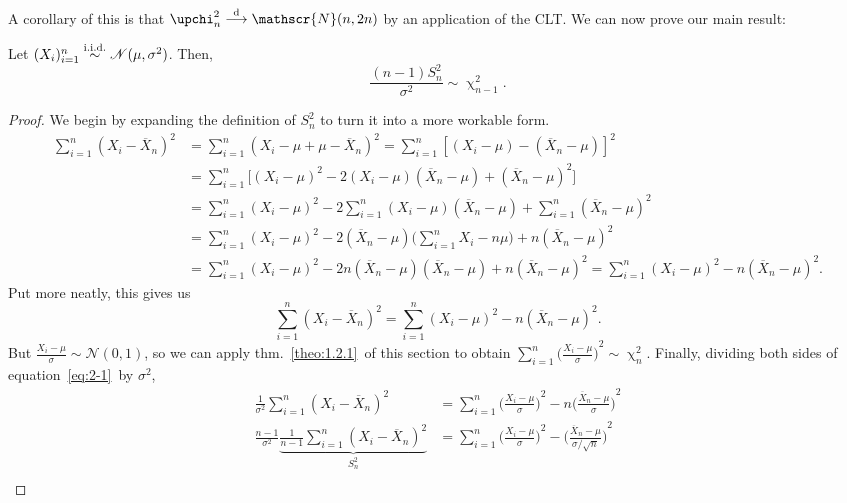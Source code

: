 A corollary of this is that \(\upchi_n^2 \approach \mathscr{N}(n,2n)\) by an application of the CLT. 
We can now prove our main result: 

\begin{theorem}
    Let \((X_i)_{i=1}^n \stackrel{\mathrm{i.i.d.}}{\sim} \mathscr{N}(\mu, \sigma^2)\). Then,\[
    \frac{(n-1)S_n^2}{\sigma^2} \sim \upchi_{n-1}^2.
    \]
\end{theorem}

\begin{proof}
    We begin by expanding the definition of \(S_n^2\) to turn it into a more workable form.\begin{align*}
        \sum_{i=1}^n {(X_i - \overline{X}_n)}^2 &= \sum_{i=1}^n {(X_i - \mu + \mu - \overline{X}_n)}^2 = \sum_{i=1}^n {[(X_i - \mu) - (\overline{X}_n -\mu)]}^2 \\ 
        &= \sum_{i=1}^n \big[{(X_i -\mu)}^2  - 2(X_i - \mu)(\overline{X}_n -\mu) + {(\overline{X}_n - \mu)}^2\big] \\ 
        &= \sum_{i=1}^n {(X_i -\mu)}^2 - 2 \sum_{i=1}^n (X_i - \mu)(\overline{X}_n -\mu) + \sum_{i=1}^n {(\overline{X}_n - \mu)}^2 \\ 
        &= \sum_{i=1}^n {(X_i -\mu)}^2 - 2(\overline{X}_n - \mu )\bigg(\sum_{i=1}^{n} X_i - n\mu\bigg) + n{(\overline{X}_n -\mu)}^2 \\ 
        &= \sum_{i=1}^n {(X_i -\mu)}^2 - 2n(\overline{X}_n - \mu )(\overline{X}_n - \mu ) + n{(\overline{X}_n -\mu)}^2 =  \sum_{i=1}^n {(X_i -\mu)}^2 - n{(\overline{X}_n -\mu)}^2.
    \end{align*}Put more neatly, this gives us\begin{equation}\label{eq:2-1}
         \sum_{i=1}^n  {(X_i - \overline{X}_n)}^2 = \sum_{i=1}^n {(X_i - \mu)}^2 - n{(\overline{X}_n - \mu)}^2.
    \end{equation} 
    But \(\frac{X_i - \mu}{\sigma} \sim \mathscr{N}(0,1)\), so we can apply thm.~\ref{theo:1.2.1}~of this section to obtain \(
    \sum_{i=1}^n {\big(\frac{X_i - \mu}{\sigma}\big)}^2 \sim \upchi_n^2
    \). Finally, dividing both sides of equation~\ref{eq:2-1}~by \(\sigma^2\),\begin{align*}
        \frac{1}{\sigma^2}\sum_{i=1}^{n} {(X_i - \overline{X}_n)}^2&=  \sum_{i=1}^n {\bigg(\frac{X_i -\mu}{\sigma}\bigg)}^2 - n{\bigg(\frac{\overline{X}_n -\mu}{\sigma}\bigg)}^2 \\ 
        \frac{n-1}{\sigma^2} \underbrace{\frac{1}{n-1}\sum_{i=1}^{n} {(X_i - \overline{X}_n)}^2}_{S_n^2}&=  \sum_{i=1}^n {\bigg(\frac{X_i -\mu}{\sigma}\bigg)}^2- {\bigg(\frac{\overline{X}_n -\mu}{\sigma/\sqrt{n}}\bigg)}^2 \\ 

\end{align*}
\end{proof}
